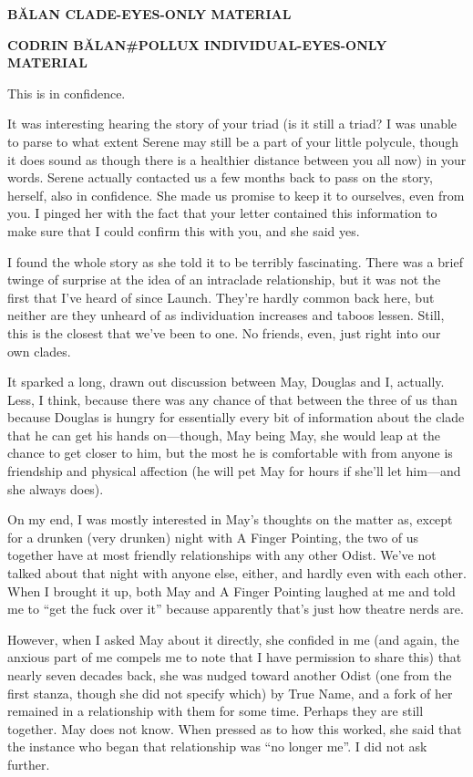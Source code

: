 \begin{center}
\textbf{BĂLAN CLADE-EYES-ONLY MATERIAL}
\end{center}

\begin{center}
\textbf{CODRIN BĂLAN\#POLLUX INDIVIDUAL-EYES-ONLY MATERIAL}
\end{center}

\noindent This is in confidence.

It was interesting hearing the story of your triad (is it still a triad? I was unable to parse to what extent Serene may still be a part of your little polycule, though it does sound as though there is a healthier distance between you all now) in your words. Serene actually contacted us a few months back to pass on the story, herself, also in confidence. She made us promise to keep it to ourselves, even from you. I pinged her with the fact that your letter contained this information to make sure that I could confirm this with you, and she said yes.

I found the whole story as she told it to be terribly fascinating. There was a brief twinge of surprise at the idea of an intraclade relationship, but it was not the first that I've heard of since Launch. They're hardly common back here, but neither are they unheard of as individuation increases and taboos lessen. Still, this is the closest that we've been to one. No friends, even, just right into our own clades.

It sparked a long, drawn out discussion between May, Douglas and I, actually. Less, I think, because there was any chance of that between the three of us than because Douglas is hungry for essentially every bit of information about the clade that he can get his hands on—though, May being May, she would leap at the chance to get closer to him, but the most he is comfortable with from anyone is friendship and physical affection (he will pet May for hours if she'll let him—and she always does).

On my end, I was mostly interested in May's thoughts on the matter as, except for a drunken (very drunken) night with A Finger Pointing, the two of us together have at most friendly relationships with any other Odist. We've not talked about that night with anyone else, either, and hardly even with each other. When I brought it up, both May and A Finger Pointing laughed at me and told me to ``get the fuck over it'' because apparently that's just how theatre nerds are.

However, when I asked May about it directly, she confided in me (and again, the anxious part of me compels me to note that I have permission to share this) that nearly seven decades back, she was nudged toward another Odist (one from the first stanza, though she did not specify which) by True Name, and a fork of her remained in a relationship with them for some time. Perhaps they are still together. May does not know. When pressed as to how this worked, she said that the instance who began that relationship was ``no longer me''. I did not ask further.

